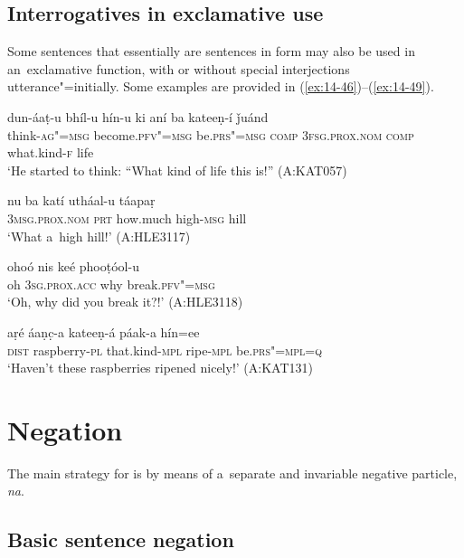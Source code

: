 \subsection{Interrogatives in exclamative use}
\label{subsec:14-2-4}

Some sentences that essentially are  sentences in form may also be used in an~exclamative function, with or without special interjections utterance"=initially. Some examples are provided in (\ref{ex:14-46})--(\ref{ex:14-49}). 

\begin{exe}
\ex
\label{ex:14-46}
\gll dun-áaṭ-u bhíl-u hín-u ki  aní ba kateeṇ-í ǰuánd \\
think-\textsc{ag"=msg} become.\textsc{pfv"=msg} be.\textsc{prs"=msg} \textsc{comp}  \textsc{3fsg.prox.nom} \textsc{comp} what.kind-\textsc{f} life  \\
\glt `He started to think: ``What kind of life this is!'' (A:KAT057)

\ex
\label{ex:14-47}
\gll nu ba katí utháal-u táapaṛ \\
\textsc{3msg.prox.nom} \textsc{prt} how.much high-\textsc{msg} hill  \\
\glt `What a~high hill!' (A:HLE3117)

\ex
\label{ex:14-48}
\gll ohoó nis keé phooṭóol-u \\
oh \textsc{3sg.prox.acc} why break.\textsc{pfv"=msg} \\
\glt `Oh, why did you break it?!' (A:HLE3118)

\ex
\label{ex:14-49}
\gll aṛé áaṇc̣-a kateeṇ-á páak-a hín=ee \\
\textsc{dist} raspberry-\textsc{pl} that.kind-\textsc{mpl} ripe-\textsc{mpl} be.\textsc{prs"=mpl=q} \\
\glt `Haven't these raspberries ripened nicely!' (A:KAT131)
\end{exe}

\section{Negation}
\label{sec:14-3}


The main strategy for  is by means of a~separate and invariable negative particle, \textit{na}. 


\subsection{Basic sentence negation}
\label{subsec:14-3-1}


